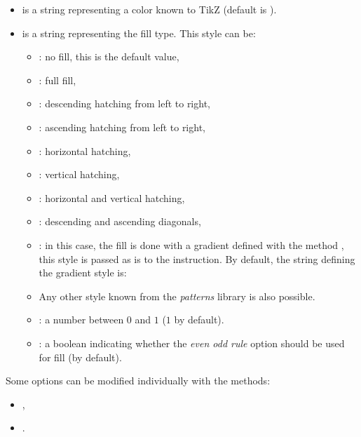 \begin{itemize}
    \item {} is a string representing a color known to TikZ (default is ).
    \item {} is a string representing the fill type. This style can be:
\begin{itemize}
    \item {}: no fill, this is the default value,
    \item {}: full fill,
    \item {}: descending hatching from left to right,
    \item {}: ascending hatching from left to right,
    \item {}: horizontal hatching,
    \item {}: vertical hatching,
    \item {}: horizontal and vertical hatching,
    \item {}: descending and ascending diagonals,
    \item {}: in this case, the fill is done with a gradient defined with the method , this style is passed as is to the \drawcmd instruction. By default, the string defining the gradient style is:
    \item Any other style known from the \emph{patterns} library is also possible.
    \item {}: a number between $0$ and $1$ ($1$ by default).
    \item {}: a boolean indicating whether the \emph{even odd rule} option should be used for fill (\false by default).
\end{itemize}
\end{itemize}

Some options can be modified individually with the methods:
\begin{itemize}
    \item {},
    \item {}.
\end{itemize}

